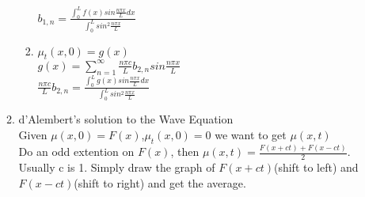 \documentclass[10pt]{article}
\begin{document}
\begin{multicols}{2}
\begin{enumerate}
\begin{enumerate}
\begin{enumerate}
					$b_{1,n} = \frac{\int_{0}^{L}f(x)sin\frac{n\pi x}{L}dx}{\int_{0}^{L}sin^2\frac{n\pi x}{L}}$\\
					\item $\mu_t(x,0) = g(x)$\\
					$g(x) = \sum_{n = 1}^{\infty} \frac{n\pi c}{L}b_{2,n}sin\frac{n\pi x}{L}$\\
					$\frac{n\pi c}{L}b_{2,n} = \frac{\int_{0}^{L}g(x)sin\frac{n\pi x}{L}dx}{\int_{0}^{L}sin^2\frac{n\pi x}{L}}$
				\end{enumerate}
			\item d'Alembert's solution to the Wave Equation\\
				Given $\mu (x,0) = F(x)$,$\mu_t (x,0) = 0$ we want to get $\mu(x,t)$\\
				Do an odd extention on $F(x)$, then $\mu(x,t) = \frac{F(x+ct) + F(x-ct)}{2}$. Usually c is 1. Simply draw the graph of $F(x+ct)$(shift to left) and $F(x-ct)$(shift to right) and get the average.
	    \end{enumerate}
    

\end{enumerate}
\end{multicols}
\end{document}
